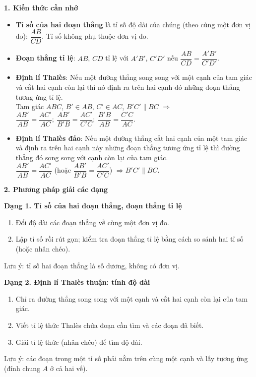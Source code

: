 \textbf{1. Kiến thức cần nhớ}
\begin{itemize}
\item \textbf{Tỉ số của hai đoạn thẳng} là tỉ số độ dài của chúng (theo cùng một đơn vị đo): $\dfrac{AB}{CD}$. Tỉ số không phụ thuộc đơn vị đo.
\item \textbf{Đoạn thẳng tỉ lệ}: $AB$, $CD$ tỉ lệ với $A'B'$, $C'D'$ nếu $\dfrac{AB}{CD}=\dfrac{A'B'}{C'D'}$.
\item \textbf{Định lí Thalès}: Nếu một đường thẳng song song với một cạnh của tam giác và cắt hai cạnh còn lại thì nó định ra trên hai cạnh đó những đoạn thẳng tương ứng tỉ lệ.\\
Tam giác $ABC$, $B'\in AB$, $C'\in AC$, $B'C'\parallel BC$ $\Rightarrow$ $\boxed{\dfrac{AB'}{AB}=\dfrac{AC'}{AC};\ \dfrac{AB'}{B'B}=\dfrac{AC'}{C'C};\ \dfrac{B'B}{AB}=\dfrac{C'C}{AC}}$.
\item \textbf{Định lí Thalès đảo}: Nếu một đường thẳng cắt hai cạnh của một tam giác và định ra trên hai cạnh này những đoạn thẳng tương ứng tỉ lệ thì đường thẳng đó song song với cạnh còn lại của tam giác.\\
$\dfrac{AB'}{AB}=\dfrac{AC'}{AC}$ (hoặc $\dfrac{AB'}{B'B}=\dfrac{AC'}{C'C}$) $\Rightarrow B'C'\parallel BC$.
\end{itemize}

\textbf{2. Phương pháp giải các dạng}

\textbf{Dạng 1. Tỉ số của hai đoạn thẳng, đoạn thẳng tỉ lệ}
\begin{enumerate}
\item Đổi độ dài các đoạn thẳng về cùng một đơn vị đo.
\item Lập tỉ số rồi rút gọn; kiểm tra đoạn thẳng tỉ lệ bằng cách so sánh hai tỉ số (hoặc nhân chéo).
\end{enumerate}
Lưu ý: tỉ số hai đoạn thẳng là số dương, không có đơn vị.

\textbf{Dạng 2. Định lí Thalès thuận: tính độ dài}
\begin{enumerate}
\item Chỉ ra đường thẳng song song với một cạnh và cắt hai cạnh còn lại của tam giác.
\item Viết tỉ lệ thức Thalès chứa đoạn cần tìm và các đoạn đã biết.
\item Giải tỉ lệ thức (nhân chéo) để tìm độ dài.
\end{enumerate}
Lưu ý: các đoạn trong một tỉ số phải nằm trên cùng một cạnh và lấy tương ứng (đỉnh chung $A$ ở cả hai vế).


